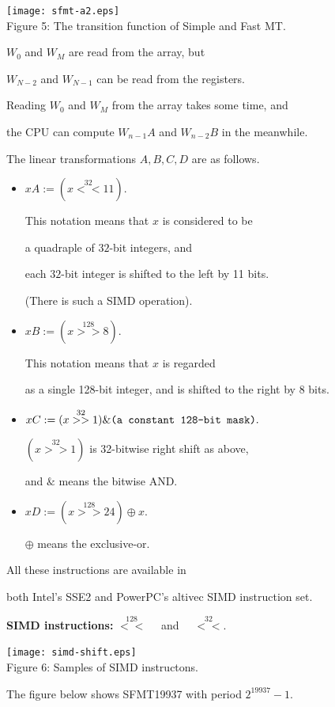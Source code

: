 \documentclass[a4j,12pt,landscape]{jarticle}
\begin{document}
\newpage
\begin{center}
\texttt{[image: sfmt-a2.eps]}
\\
Figure 5: The transition function of Simple and Fast MT.

$W_0$ and $W_M$ are read from the array, but

$W_{N-2}$ and $W_{N-1}$ can be read from the registers.
\end{center}

\newpage
Reading $W_0$ and $W_M$ from the array takes some time, and 

the CPU can compute $W_{n-1}A$ and $W_{n-2}B$ in the meanwhile.

The linear transformations $A,B,C,D$ are as follows.
\begin{itemize}
\item
$x A := (x \stackrel{32}{<<} 11).$

This notation means that $x$ is considered to be 

a quadraple of $32$-bit integers, and

each $32$-bit integer is shifted to the left by 11 bits.

(There is such a SIMD operation).

\item 
$x B := (x \stackrel{128}{>>} 8).$

This notation means that $x$ is regarded

as a single 128-bit integer, and 
is shifted to the right by 8 bits.

\newpage
\item
$x C := (x \stackrel{32}{>>} 1) \& \mbox{\tt (a constant 128-bit mask)}.$

$(x \stackrel{32}{>>} 1)$ is 32-bitwise right shift as above,

and $\&$ means the bitwise AND. 

\item 
$x D := (x \stackrel{128}{>>} 24) \oplus x.$

$\oplus$ means the exclusive-or.
\end{itemize}

All these instructions are available in 

both Intel's SSE2 and 
PowerPC's altivec SIMD
instruction set.

\newpage
{\bf SIMD instructions:} 
$\stackrel{128}{<<}\quad$ and $\quad\stackrel{32}{<<}$.
\begin{center}
\texttt{[image: simd-shift.eps]}
\\
Figure 6: Samples of SIMD instructons.
\end{center}
\newpage
The figure below shows SFMT19937 with period $2^{19937}-1$.
\end{document}
